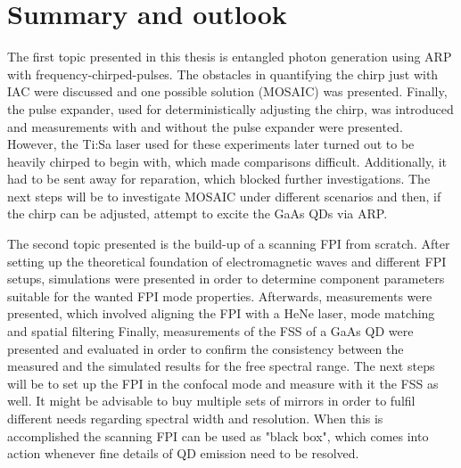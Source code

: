 \chapter{Summary and outlook}
The first topic presented in this thesis is entangled photon generation using \ac{ARP} with frequency-chirped-pulses.
The obstacles in quantifying the chirp just with \ac{IAC} were discussed and one possible solution (\ac{MOSAIC}) was presented.
Finally, the pulse expander, used for deterministically adjusting the chirp, was introduced and measurements with and without the pulse expander were presented.
However, the Ti:Sa laser used for these experiments later turned out to be heavily chirped to begin with, which made comparisons difficult.
Additionally, it had to be sent away for reparation, which blocked further investigations.
The next steps will be to investigate \ac{MOSAIC} under different scenarios and then, if the chirp can be adjusted, attempt to excite the GaAs \acp{QD} via \ac{ARP}.

The second topic presented is the build-up of a scanning \ac{FPI} from scratch.
After setting up the theoretical foundation of electromagnetic waves and different \ac{FPI} setups, simulations were presented in order to determine component parameters suitable for the wanted \ac{FPI} mode properties.
Afterwards, measurements were presented, which involved aligning the \ac{FPI} with a HeNe laser, mode matching and spatial filtering
Finally, measurements of the \ac{FSS} of a GaAs \ac{QD} were presented and evaluated in order to confirm the consistency between the measured and the simulated results for the free spectral range.
The next steps will be to set up the \ac{FPI} in the confocal mode and measure with it the \ac{FSS} as well.
It might be advisable to buy multiple sets of mirrors in order to fulfil different needs regarding spectral width and resolution.
When this is accomplished the scanning \ac{FPI} can be used as "black box", which comes into action whenever fine details of \ac{QD} emission need to be resolved.

